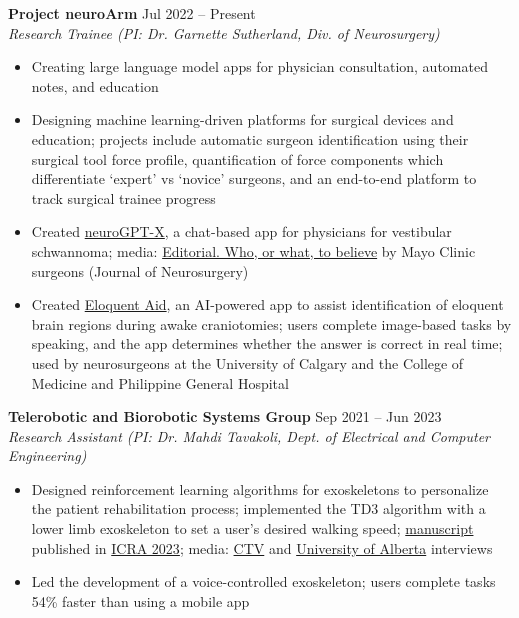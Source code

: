 \documentclass{article}
\begin{document}
\textbf{Project neuroArm} \hfill Jul 2022 -- Present\\
\textit{Research Trainee (PI: Dr. Garnette Sutherland, Div. of Neurosurgery)}
\begin{itemize}
    \item Creating large language model apps for physician consultation, automated notes, and education
    \item Designing machine learning-driven platforms for surgical devices and education; projects include automatic surgeon identification using their surgical tool force profile, quantification of force components which differentiate `expert' vs `novice' surgeons, and an end-to-end platform to track surgical trainee progress
    \item Created \href{https://neurogpt-x.azurewebsites.net/}{neuroGPT-X}, a chat-based app for physicians for vestibular schwannoma; media: \href{https://thejns.org/view/journals/j-neurosurg/139/4/article-p1001.xml}{Editorial. Who, or what, to believe} by Mayo Clinic surgeons (Journal of Neurosurgery)
    \item Created \href{https://www.eloquentaid.com/}{Eloquent Aid}, an AI-powered app to assist identification of eloquent brain regions during awake craniotomies; users complete image-based tasks by speaking, and the app determines whether the answer is correct in real time; used by neurosurgeons at the University of Calgary and the College of Medicine and Philippine General Hospital
\end{itemize} \vspace{1em}

\textbf{Telerobotic and Biorobotic Systems Group} \hfill Sep 2021 -- Jun 2023\\
\textit{Research Assistant (PI: Dr. Mahdi Tavakoli, Dept. of Electrical and Computer Engineering)}
\begin{itemize}
    \item Designed reinforcement learning algorithms for exoskeletons to personalize the patient rehabilitation process; implemented the TD3 algorithm with a lower limb exoskeleton to set a user's desired walking speed; \href{https://ieeexplore.ieee.org/abstract/document/10161559/}{manuscript} published in \href{https://www.icra2023.org/}{ICRA 2023}; media: \href{https://edmonton.ctvnews.ca/u-of-a-integrating-artificial-intelligence-into-exoskeleton-technology-1.6019787}{CTV} and \href{https://www.linkedin.com/posts/university-of-alberta_ai-voice-controlled-exoskeleton-activity-6954902847477997568-CTf4?utm_source=linkedin_share&utm_medium=member_desktop_web}{University of Alberta} interviews
    \item Led the development of a voice-controlled exoskeleton; users complete tasks 54\% faster than using a mobile app
\end{itemize}
\end{document}
